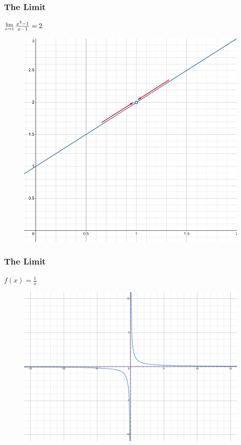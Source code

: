 \documentclass{beamer}
\def\limfunc{\frac{x^2-1}{x-1}}
\def\oneoverx{\frac{1}{x}}
\begin{document}
    \begin{frame}
        \frametitle{The Limit}
        \(\Lim{x\to 1}\limfunc = 2\)\\[28.5pt]
        \begin{figure}
            \centering
            \includegraphics[width=0.6\linewidth]{include/images/limit_4.png}
        \end{figure}
    \end{frame}

    \begin{frame}
        \frametitle{The Limit}
        \(f(x)=\oneoverx\)\\
        \begin{figure}
            \centering
            \includegraphics[width=0.75\linewidth]{include/images/invx_1.png}
        \end{figure}
    \end{frame}
\end{document}

